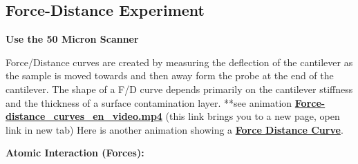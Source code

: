 \documentclass{../lab}
\begin{document}
\subsection{Force-Distance Experiment}
\textbf{Use the 50 Micron Scanner }

Force/Distance curves are created by measuring the deflection of the cantilever as the sample is moved towards and then away form the probe at the end of the cantilever.  The shape of a F/D curve depends primarily on the cantilever stiffness and the thickness of a surface contamination layer.
**see animation \href{http://experimentationlab.berkeley.edu/sites/default/files/AFMImages/Force-distance\_curves\_en\_video.mp4}{\textbf{Force-distance\_curves\_en\_video.mp4}} (this link brings you to a new page, open link in new tab)
Here is another animation showing a \href{http://experimentationlab.berkeley.edu/sites/default/files/AFMImages/6.1\%20Tip\%20Sample.flv\_converted.mp4}{\textbf{Force Distance Curve}}.


\textbf{Atomic Interaction (Forces):}
\end{document}
